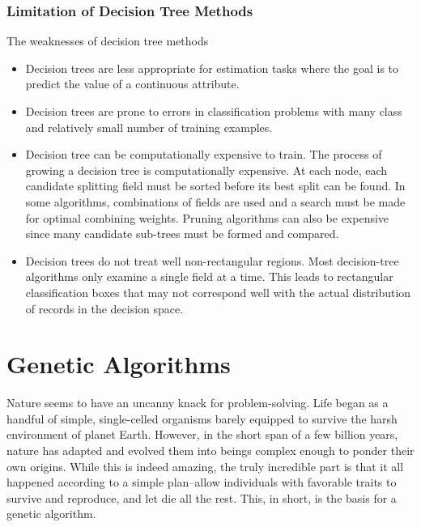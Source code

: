 \documentclass[12pt]{report}
\begin{document}
\subsection{Limitation of Decision Tree Methods}
The weaknesses of decision tree methods

\begin{itemize}
\item{Decision trees are less appropriate for estimation tasks where the goal is to predict the value of a continuous attribute.}
\item{Decision trees are prone to errors in classification problems with many class and relatively small number of training examples.}
\item{Decision tree can be computationally expensive to train. The process of growing a decision tree is computationally expensive. At each node, each candidate splitting field must be sorted before its best split can be found. In some algorithms, combinations of fields are used and a search must be made for optimal combining weights. Pruning algorithms can also be expensive since many candidate sub-trees must be formed and compared.}
\item{Decision trees do not treat well non-rectangular regions. Most decision-tree algorithms only examine a single field at a time. This leads to rectangular classification boxes that may not correspond well with the actual distribution of records in the decision space. }

\end{itemize}





\pagestyle{fancy}
\chead{}
\rfoot{\small{\thepage}}
\renewcommand{\headrulewidth}{0.4pt}
\renewcommand{\footrulewidth}{0.4pt}

\chapter{Genetic Algorithms}

Nature seems to have an uncanny knack for problem-solving. Life began as a handful of simple, single-celled organisms barely equipped to survive the harsh environment of planet Earth. However, in the short span of a few billion years, nature has adapted and evolved them into beings complex enough to ponder their own origins. While this is indeed amazing, the truly incredible part is that it all happened according to a simple plan--allow individuals with favorable traits to survive and reproduce, and let die all the rest. This, in short, is the basis for a genetic algorithm. 
\end{document}
